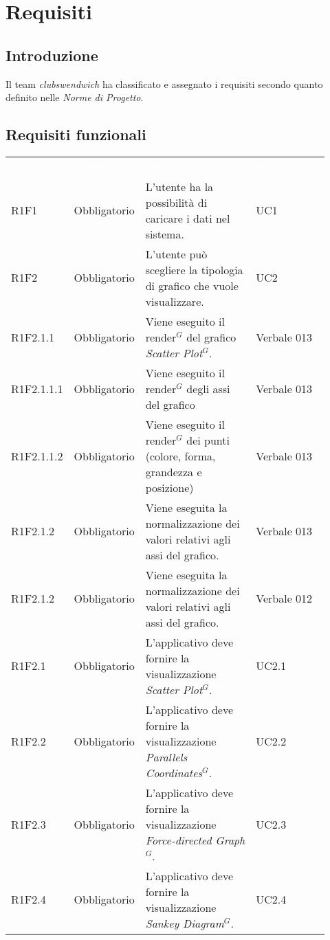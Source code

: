 \section{Requisiti}
\subsection{Introduzione}
Il team \textit{clubswendwich} ha classificato e assegnato i requisiti secondo quanto definito nelle \textit{Norme di Progetto}.
\subsection{Requisiti funzionali}
{\renewcommand{\arraystretch}{1.5}
\begin{longtable}{p{0.12\linewidth}p{0.15\linewidth}p{0.50\linewidth}p{0.15\linewidth}}
	\rowcolor[RGB]{33, 73, 50}
	\textcolor{white}{\textbf{Codice}} & \textcolor{white}{\textbf{Classe}} & \textcolor{white}{\textbf{Descrizione}} &
    \textcolor{white}{\textbf{Riferimenti}}\\
    
    \rowcolor[RGB]{216, 235, 171}
    R1F1 & Obbligatorio & L'utente ha la possibilità di caricare i dati nel sistema. & UC1\\
    \rowcolor[RGB]{233, 245, 206}
    R1F2 & Obbligatorio & L'utente può scegliere la tipologia di grafico che vuole visualizzare. & UC2\\
    \rowcolor[RGB]{216, 235, 171}
    R1F2.1.1 & Obbligatorio & Viene eseguito il render$^{G}$ del grafico \textit{Scatter Plot$^{G}$}. & Verbale 013\\
    \rowcolor[RGB]{233, 245, 206}
    R1F2.1.1.1 & Obbligatorio & Viene eseguito il render$^{G}$ degli assi del grafico & Verbale 013\\
    \rowcolor[RGB]{216, 235, 171}
    R1F2.1.1.2 & Obbligatorio & Viene eseguito il render$^{G}$ dei punti (colore, forma, grandezza e posizione)& Verbale 013\\
    \rowcolor[RGB]{233, 245, 206}
    R1F2.1.2 & Obbligatorio & Viene eseguita la normalizzazione dei valori relativi agli assi del grafico. & Verbale 013\\
    \rowcolor[RGB]{216, 235, 171}
    R1F2.1.2 & Obbligatorio & Viene eseguita la normalizzazione dei valori relativi agli assi del grafico. & Verbale 012\\
    \rowcolor[RGB]{233, 245, 206}
    R1F2.1 & Obbligatorio & L'applicativo deve fornire la visualizzazione \textit{Scatter Plot$^{G}$}. & UC2.1\\
    \rowcolor[RGB]{216, 235, 171}
    R1F2.2 & Obbligatorio & L'applicativo deve fornire la visualizzazione \textit{Parallels Coordinates$^{G}$}. & UC2.2\\
    \rowcolor[RGB]{233, 245, 206}
    R1F2.3 & Obbligatorio & L'applicativo deve fornire la visualizzazione \textit{Force-directed Graph$^{G}$}. & UC2.3\\
    \rowcolor[RGB]{216, 235, 171}
    R1F2.4 & Obbligatorio & L'applicativo deve fornire la visualizzazione \textit{Sankey Diagram$^{G}$}. & UC2.4\\
    

\end{longtable}}
